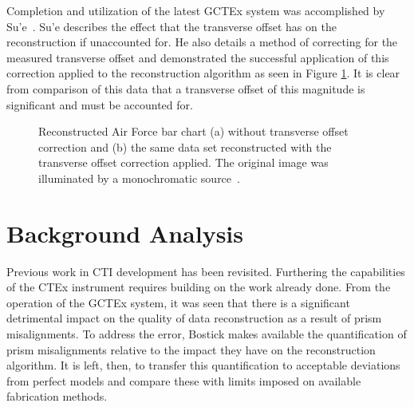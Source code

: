 Completion and utilization of the latest \ac{GCTEx} system was accomplished by Su'e~\cite{Sue}. Su'e describes the effect that the transverse offset has on the reconstruction if unaccounted for. He also details a method of correcting for the measured transverse offset and demonstrated the successful application of this correction applied to the reconstruction algorithm as seen in Figure \ref{fig:transCorr}. It is clear from comparison of this data that a transverse offset of this magnitude is significant and must be accounted for.

\begin{figure}[h]		%
\begin{center}
\caption{Reconstructed Air Force bar chart (a) without transverse offset correction and (b) the same data set reconstructed with the transverse offset correction applied. The original image was illuminated by a monochromatic source~\cite{Sue}.}
\label{fig:transCorr}
\end{center}
\end{figure}

\section{Background Analysis}
\label{sec:backgroundAnalysis}

Previous work in \ac{CTI} development has been revisited. Furthering the capabilities of the \ac{CTEx} instrument requires building on the work already done. From the operation of the \ac{GCTEx} system, it was seen that there is a significant detrimental impact on the quality of data reconstruction as a result of prism misalignments. To address the error, Bostick makes available the quantification of prism misalignments relative to the impact they have on the reconstruction algorithm. It is left, then, to transfer this quantification to acceptable deviations from perfect models and compare these with limits imposed on available fabrication methods.

